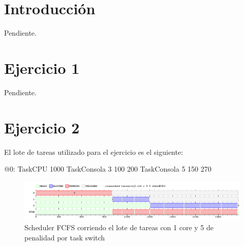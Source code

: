 \documentclass[a4paper,10pt,twoside]{article}
\newenvironment{pseudo}[1][]{%
    \vspace{0.5em}%
    \begin{algorithmic}%
}
{%
    \end{algorithmic}%
    \vspace{0.5em}%
}
\begin{document}
\newpage




\tableofcontents

\newpage




\section{Introducción}

Pendiente.




\section{Ejercicio 1}

Pendiente.




\section{Ejercicio 2}
El lote de tareas utilizado para el ejercicio es el siguiente:
\begin{pseudo}
	\State @0:
	\State TaskCPU 1000
	\State TaskConsola 3 100 200
	\State TaskConsola 5 150 270
\end{pseudo}

\begin{figure}[ht!]
\centering
\includegraphics[width=175mm]{../ejercicio2/FCFS1Core.png}
\caption{Scheduler FCFS corriendo el lote de tareas con 1 core y 5 de penalidad por task switch}
\label{overflow}
\end{figure}
\end{document}
